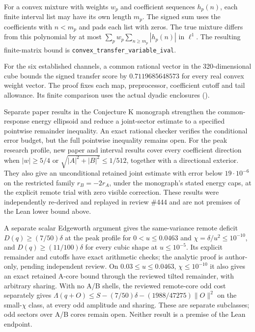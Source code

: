 \documentclass[11pt,a4paper]{article}
\newcommand{\lean}[1]{\texttt{\small #1}}
\begin{document}
For a convex mixture with weights $w_p$ and coefficient sequences $h_p(n)$,
each finite interval list may have its own length $m_p$.
The signed sum uses the coefficients with $n<m_p$ and pads each list with zeros.
The true mixture differs from this polynomial by at most
$\sum_p w_p\sum_{n\ge m_p}|h_p(n)|$ in $\ell^1$.
The resulting finite-matrix bound is \lean{convex\_transfer\_variable\_ival}.

For the six established channels, a common rational vector in the 320-dimensional cube
bounds the signed transfer score by $0.7119685648573$ for every real convex weight vector.
The proof fixes each map, preprocessor, coefficient cutoff and tail allowance. Its finite
comparison uses the actual dyadic enclosures ().

Separate paper results in the Conjecture K monograph strengthen the common-response
energy ellipsoid and reduce a joint-sector estimate to a specified pointwise remainder
inequality. An exact rational checker verifies the conditional error budget, but
the full pointwise inequality remains open. For the peak research profile, new
paper and interval results cover every coefficient direction when $|w|\geq5/4$
or $\sqrt{|A|^2+|B|^2}\leq1/512$, together with a directional exterior.
They also give an unconditional retained joint estimate with error below
$19\cdot10^{-6}$ on the restricted family $r_B=-2r_A$, under the monograph's
stated energy caps, at the explicit remote trial with zero visible correction.
These results were independently re-derived and replayed in review \#444 and are
not premises of the Lean lower bound above.

A separate scalar Edgeworth argument gives the same-variance remote deficit
$D(q)\geq(7/50)\delta$ at the peak profile for $0<u\leq0.0463$
and $\chi=\delta/u^2\leq10^{-10}$, and $D(q)\geq(11/100)\delta$ for every
cubic shape at $u\leq10^{-5}$. Its explicit remainder and cutoffs have
exact arithmetic checks; the analytic proof is author-only, pending independent
review. On $0.03\leq u\leq0.0463$, $\chi\leq10^{-10}$ it also gives an exact
retained A-core bound through the reviewed tilted remainder, with arbitrary
sharing. With no A/B shells, the reviewed remote-core odd cost separately gives
$\Lambda(q+O)\leq S-(7/50)\delta-(1988/47275)\|O\|^2$ on the small-$\chi$
class, at every odd amplitude and sharing. These are separate subclasses;
odd sectors over A/B cores remain open. Neither result is a premise of the Lean endpoint.
\end{document}
